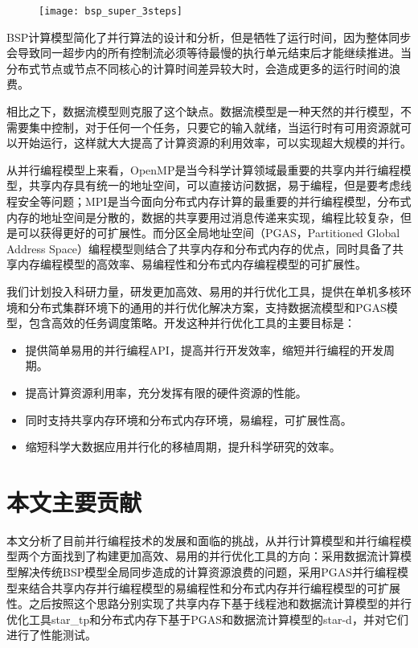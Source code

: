 \begin{figure}[!htbp]
    \centering
    \texttt{[image: bsp\_super\_3steps]}
    \label{fig:bsp_super_3steps}
\end{figure}

BSP计算模型简化了并行算法的设计和分析，但是牺牲了运行时间，因为整体同步会导致同一超步内的所有控制流必须等待最慢的执行单元结束后才能继续推进。当分布式节点或节点不同核心的计算时间差异较大时，会造成更多的运行时间的浪费。

相比之下，数据流模型则克服了这个缺点。数据流模型是一种天然的并行模型，不需要集中控制，对于任何一个任务，只要它的输入就绪，当运行时有可用资源就可以开始运行，这样就大大提高了计算资源的利用效率，可以实现超大规模的并行。

从并行编程模型上来看，OpenMP是当今科学计算领域最重要的共享内并行编程模型，共享内存具有统一的地址空间，可以直接访问数据，易于编程，但是要考虑线程安全等问题；MPI是当今面向分布式内存计算的最重要的并行编程模型，分布式内存的地址空间是分散的，数据的共享要用过消息传递来实现，编程比较复杂，但是可以获得更好的可扩展性。而分区全局地址空间（PGAS，Partitioned Global Address Space）编程模型则结合了共享内存和分布式内存的优点，同时具备了共享内存编程模型的高效率、易编程性和分布式内存编程模型的可扩展性。

我们计划投入科研力量，研发更加高效、易用的并行优化工具，提供在单机多核环境和分布式集群环境下的通用的并行优化解决方案，支持数据流模型和PGAS模型，包含高效的任务调度策略。开发这种并行优化工具的主要目标是：

\begin{itemize}
	\item 提供简单易用的并行编程API，提高并行开发效率，缩短并行编程的开发周期。
	\item 提高计算资源利用率，充分发挥有限的硬件资源的性能。
	\item 同时支持共享内存环境和分布式内存环境，易编程，可扩展性高。
	\item 缩短科学大数据应用并行化的移植周期，提升科学研究的效率。
\end{itemize}

\section{本文主要贡献}

本文分析了目前并行编程技术的发展和面临的挑战，从并行计算模型和并行编程模型两个方面找到了构建更加高效、易用的并行优化工具的方向：采用数据流计算模型解决传统BSP模型全局同步造成的计算资源浪费的问题，采用PGAS并行编程模型来结合共享内存并行编程模型的易编程性和分布式内存并行编程模型的可扩展性。之后按照这个思路分别实现了共享内存下基于线程池和数据流计算模型的并行优化工具star\_tp和分布式内存下基于PGAS和数据流计算模型的star-d，并对它们进行了性能测试。

